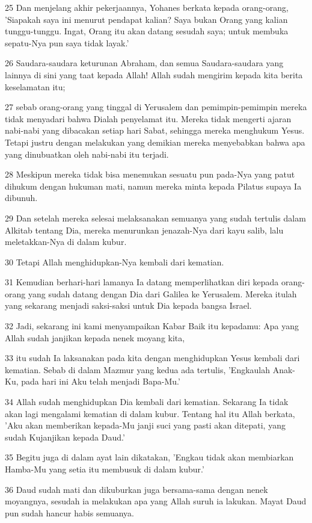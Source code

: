 \par 25 Dan menjelang akhir pekerjaannya, Yohanes berkata kepada orang-orang, 'Siapakah saya ini menurut pendapat kalian? Saya bukan Orang yang kalian tunggu-tunggu. Ingat, Orang itu akan datang sesudah saya; untuk membuka sepatu-Nya pun saya tidak layak.'
\par 26 Saudara-saudara keturunan Abraham, dan semua Saudara-saudara yang lainnya di sini yang taat kepada Allah! Allah sudah mengirim kepada kita berita keselamatan itu;
\par 27 sebab orang-orang yang tinggal di Yerusalem dan pemimpin-pemimpin mereka tidak menyadari bahwa Dialah penyelamat itu. Mereka tidak mengerti ajaran nabi-nabi yang dibacakan setiap hari Sabat, sehingga mereka menghukum Yesus. Tetapi justru dengan melakukan yang demikian mereka menyebabkan bahwa apa yang dinubuatkan oleh nabi-nabi itu terjadi.
\par 28 Meskipun mereka tidak bisa menemukan sesuatu pun pada-Nya yang patut dihukum dengan hukuman mati, namun mereka minta kepada Pilatus supaya Ia dibunuh.
\par 29 Dan setelah mereka selesai melaksanakan semuanya yang sudah tertulis dalam Alkitab tentang Dia, mereka menurunkan jenazah-Nya dari kayu salib, lalu meletakkan-Nya di dalam kubur.
\par 30 Tetapi Allah menghidupkan-Nya kembali dari kematian.
\par 31 Kemudian berhari-hari lamanya Ia datang memperlihatkan diri kepada orang-orang yang sudah datang dengan Dia dari Galilea ke Yerusalem. Mereka itulah yang sekarang menjadi saksi-saksi untuk Dia kepada bangsa Israel.
\par 32 Jadi, sekarang ini kami menyampaikan Kabar Baik itu kepadamu: Apa yang Allah sudah janjikan kepada nenek moyang kita,
\par 33 itu sudah Ia laksanakan pada kita dengan menghidupkan Yesus kembali dari kematian. Sebab di dalam Mazmur yang kedua ada tertulis, 'Engkaulah Anak-Ku, pada hari ini Aku telah menjadi Bapa-Mu.'
\par 34 Allah sudah menghidupkan Dia kembali dari kematian. Sekarang Ia tidak akan lagi mengalami kematian di dalam kubur. Tentang hal itu Allah berkata, 'Aku akan memberikan kepada-Mu janji suci yang pasti akan ditepati, yang sudah Kujanjikan kepada Daud.'
\par 35 Begitu juga di dalam ayat lain dikatakan, 'Engkau tidak akan membiarkan Hamba-Mu yang setia itu membusuk di dalam kubur.'
\par 36 Daud sudah mati dan dikuburkan juga bersama-sama dengan nenek moyangnya, sesudah ia melakukan apa yang Allah suruh ia lakukan. Mayat Daud pun sudah hancur habis semuanya.
